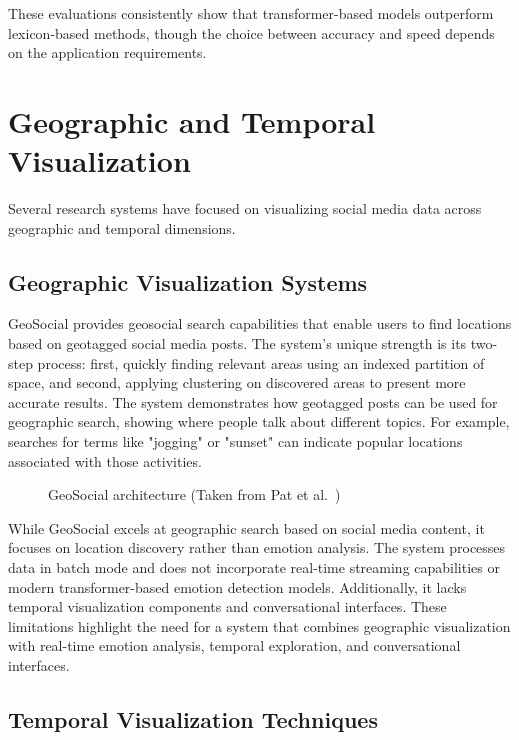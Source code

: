 These evaluations consistently show that transformer-based models outperform lexicon-based methods, though the choice between accuracy and speed depends on the application requirements.


\section{Geographic and Temporal Visualization}

Several research systems have focused on visualizing social media data across geographic and temporal dimensions.

\subsection{Geographic Visualization Systems}

GeoSocial \cite{pat2015geosocial} provides geosocial search capabilities that enable users to find locations based on geotagged social media posts. The system's unique strength is its two-step process: first, quickly finding relevant areas using an indexed partition of space, and second, applying clustering on discovered areas to present more accurate results. The system demonstrates how geotagged posts can be used for geographic search, showing where people talk about different topics. For example, searches for terms like "jogging" or "sunset" can indicate popular locations associated with those activities.

\begin{figure}[htbp]
\centering

\caption{GeoSocial architecture (Taken from Pat et al.~\cite{pat2015geosocial})}
\label{fig:geosocial}
\end{figure}

While GeoSocial excels at geographic search based on social media content, it focuses on location discovery rather than emotion analysis. The system processes data in batch mode and does not incorporate real-time streaming capabilities or modern transformer-based emotion detection models. Additionally, it lacks temporal visualization components and conversational interfaces. These limitations highlight the need for a system that combines geographic visualization with real-time emotion analysis, temporal exploration, and conversational interfaces.

\subsection{Temporal Visualization Techniques}

